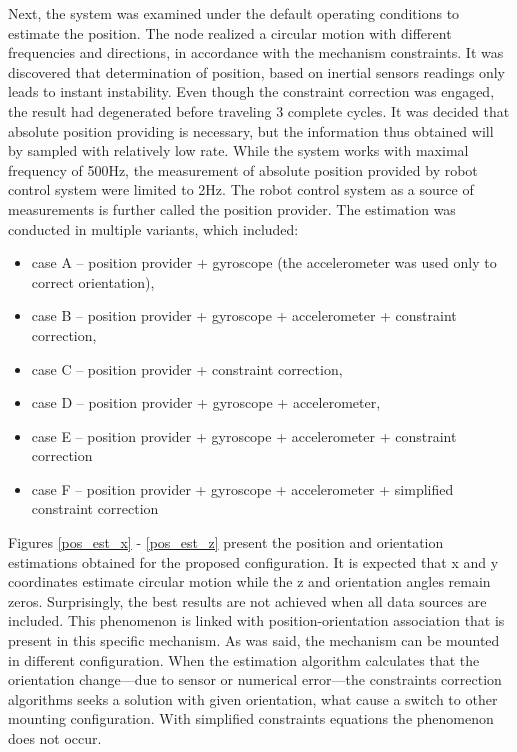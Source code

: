 Next, the system was examined under the default operating conditions to estimate the position. The node realized a circular motion with different frequencies and directions, in accordance with the mechanism constraints. It was discovered that determination of position, based on inertial sensors readings only leads to instant instability. Even though the constraint correction was engaged, the result had degenerated before traveling  3 complete cycles. It was decided that absolute position providing is necessary, but the information thus obtained will by sampled with relatively low rate. While the system works with maximal frequency of 500Hz, the measurement of absolute position provided by robot control system were limited to 2Hz. The robot control system as a source of measurements is further called the position provider. The estimation was conducted in multiple variants, which included:
\begin{itemize}
	\item case A -- position provider + gyroscope (the accelerometer was used only to correct orientation),
	\item case B -- position provider + gyroscope + accelerometer + constraint correction,
	\item case C -- position provider + constraint correction,
	\item case D -- position provider + gyroscope + accelerometer,
	\item case E -- position provider + gyroscope + accelerometer + constraint correction
	\item case F -- position provider + gyroscope + accelerometer + simplified constraint correction
\end{itemize}

Figures \ref{pos_est_x} - \ref{pos_est_z} present the position and orientation estimations obtained for the proposed configuration. It is expected that x and y coordinates estimate circular motion while the z and orientation angles remain zeros. Surprisingly, the best results are not achieved when all data sources are included. This phenomenon is linked with position-orientation association that is present in this specific mechanism. As was said, the mechanism can be mounted in different configuration. When the estimation algorithm calculates that the orientation change---due to sensor or numerical error---the constraints correction algorithms seeks a solution with given orientation, what cause a switch to other mounting configuration. With simplified constraints equations the phenomenon does not occur.\\

